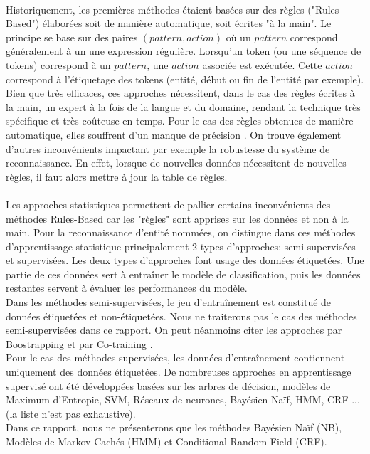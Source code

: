 \noindent{}\\

Historiquement, les premières méthodes étaient basées sur des règles ("Rules-Based") élaborées soit de manière automatique, soit écrites "à la main". Le principe se base sur des paires $(pattern, action)$ où un $pattern$ correspond généralement à un une expression régulière. Lorsqu'un token (ou une séquence de tokens) correspond à un $pattern$, une $action$ associée est exécutée. Cette $action$ correspond à l'étiquetage des tokens (entité, début ou fin de l'entité par exemple). Bien que très efficaces, ces approches nécessitent, dans le cas des règles écrites à la main, un expert à la fois de la langue et du domaine, rendant la technique très spécifique et très coûteuse en temps. Pour le cas des règles obtenues de manière automatique, elles souffrent d'un manque de précision \cite{Mladenic2017}. On trouve également d'autres inconvénients impactant par exemple la robustesse du système de reconnaissance. En effet, lorsque de nouvelles données nécessitent de nouvelles règles, il faut alors mettre à jour la table de règles.\\

\noindent{}\\

Les approches statistiques permettent de pallier certains inconvénients des méthodes Rules-Based car les "règles" sont apprises sur les données et non à la main. Pour la reconnaissance d'entité nommées, on distingue dans ces méthodes d'apprentissage statistique principalement 2 types d'approches: semi-supervisées et supervisées. Les deux types d'approches font usage des données étiquetées. Une partie de ces données sert à entraîner le modèle de classification, puis les données restantes servent à évaluer les performances du modèle.\\
Dans les méthodes semi-supervisées, le jeu d'entraînement est constitué de données étiquetées et non-étiquetées. Nous ne traiterons pas le cas des méthodes semi-supervisées dans ce rapport. On peut néanmoins citer les approches par Boostrapping \cite{Thenmalar} et par Co-training \cite{Cotraining}.\\
Pour le cas des méthodes supervisées, les données d'entraînement contiennent uniquement des données étiquetées. De nombreuses approches en apprentissage supervisé ont été développées basées sur les arbres de décision, modèles de Maximum d'Entropie, SVM, Réseaux de neurones, Bayésien Naïf, HMM, CRF ... (la liste n'est pas exhaustive).\\
Dans ce rapport, nous ne présenterons que les méthodes Bayésien Naïf (NB), Modèles de Markov Cachés (HMM) et Conditional Random Field (CRF).
